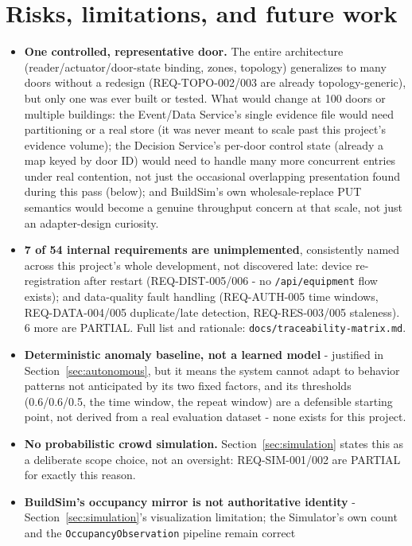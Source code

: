 \documentclass[11pt]{article}
\begin{document}
\section{Risks, limitations, and future work}
\label{sec:risks}

\begin{itemize}
\item \textbf{One controlled, representative door.} The entire
architecture (reader/actuator/door-state binding, zones, topology)
generalizes to many doors without a redesign (REQ-TOPO-002/003 are
already topology-generic), but only one was ever built or tested. What
would change at 100 doors or multiple buildings: the Event/Data Service's
single evidence file would need partitioning or a real store (it was
never meant to scale past this project's evidence volume); the Decision
Service's per-door control state (already a map keyed by door ID) would
need to handle many more concurrent entries under real contention, not
just the occasional overlapping presentation found during this pass
(below); and BuildSim's own wholesale-replace PUT semantics would become
a genuine throughput concern at that scale, not just an adapter-design
curiosity.
\item \textbf{7 of 54 internal requirements are unimplemented}, consistently
named across this project's whole development, not discovered late:
device re-registration after restart (REQ-DIST-005/006 - no
\texttt{/api/equipment} flow exists); and data-quality fault handling
(REQ-AUTH-005 time windows, REQ-DATA-004/005 duplicate/late detection,
REQ-RES-003/005 staleness). 6 more are PARTIAL. Full list and rationale:
\texttt{docs/traceability-matrix.md}.
\item \textbf{Deterministic anomaly baseline, not a learned model} -
justified in Section~\ref{sec:autonomous}, but it means the system cannot
adapt to behavior patterns not anticipated by its two fixed factors, and
its thresholds (0.6/0.6/0.5, the time window, the repeat window) are a
defensible starting point, not derived from a real evaluation dataset -
none exists for this project.
\item \textbf{No probabilistic crowd simulation.} Section~\ref{sec:simulation}
states this as a deliberate scope choice, not an oversight: REQ-SIM-001/002
are PARTIAL for exactly this reason.
\item \textbf{BuildSim's occupancy mirror is not authoritative identity} -
Section~\ref{sec:simulation}'s visualization limitation; the Simulator's
own count and the \texttt{OccupancyObservation} pipeline remain correct

\end{itemize}
\end{document}
